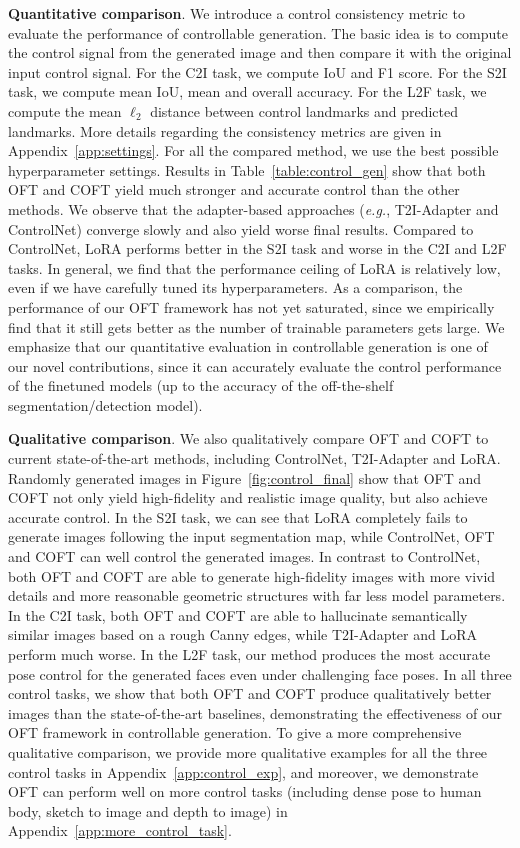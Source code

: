\textbf{Quantitative comparison}. We introduce a control consistency metric to evaluate the performance of controllable generation. The basic idea is to compute the control signal from the generated image and then compare it with the original input control signal. For the C2I task, we compute IoU and F1 score. For the S2I task, we compute mean IoU, mean and overall accuracy. For the L2F task, we compute the mean $\ell_2$ distance between control landmarks and predicted landmarks. More details regarding the consistency metrics are given in Appendix~\ref{app:settings}. For all the compared method, we use the best possible hyperparameter settings. Results in Table~\ref{table:control_gen} show that both OFT and COFT yield much stronger and accurate control than the other methods. We observe that the adapter-based approaches (\emph{e.g.}, T2I-Adapter and ControlNet) converge slowly and also yield worse final results. Compared to ControlNet, LoRA performs better in the S2I task and worse in the C2I and L2F tasks. In general, we find that the performance ceiling of LoRA is relatively low, even if we have carefully tuned its hyperparameters. As a comparison, the performance of our OFT framework has not yet saturated, since we empirically find that it still gets better as the number of trainable parameters gets large. We emphasize that our quantitative evaluation in controllable generation is one of our novel contributions, since it can accurately evaluate the control performance of the finetuned models (up to the accuracy of the off-the-shelf segmentation/detection model).

\textbf{Qualitative comparison}. We also qualitatively compare OFT and COFT to current state-of-the-art methods, including ControlNet, T2I-Adapter and LoRA. Randomly generated images in Figure~\ref{fig:control_final} show that OFT and COFT not only yield high-fidelity and realistic image quality, but also achieve accurate control. In the S2I task, we can see that LoRA completely fails to generate images following the input segmentation map, while ControlNet, OFT and COFT can well control the generated images. In contrast to ControlNet, both OFT and COFT are able to generate high-fidelity images with more vivid details and more reasonable geometric structures with far less model parameters. In the C2I task, both OFT and COFT are able to hallucinate semantically similar images based on a rough Canny edges, while T2I-Adapter and LoRA perform much worse. In the L2F task, our method produces the most accurate pose control for the generated faces even under challenging face poses. In all three control tasks, we show that both OFT and COFT produce qualitatively better images than the state-of-the-art baselines, demonstrating the effectiveness of our OFT framework in controllable generation. To give a more comprehensive qualitative comparison, we provide more qualitative examples for all the three control tasks in Appendix~\ref{app:control_exp}, and moreover, we demonstrate OFT can perform well on more control tasks (including dense pose to human body, sketch to image and depth to image) in Appendix~\ref{app:more_control_task}.

